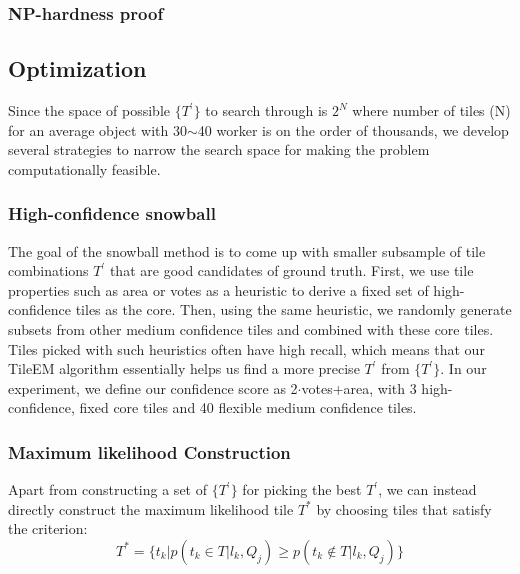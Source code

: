 \documentclass[letterpaper]{article} %
\begin{document}
\subsubsection{NP-hardness proof}
\subsection{Optimization}
Since the space of possible $\{T^{\prime}\}$ to search through is $2^{N}$ where number of tiles (N) for an average object with 30$\sim$40 worker is on the order of thousands, we develop several strategies to narrow the search space for making the problem computationally feasible. 
\subsubsection{High-confidence snowball}
The goal of the snowball method is to come up with smaller subsample of tile combinations $T^\prime$ that are good candidates of ground truth. First, we use tile properties such as area or votes as a heuristic to derive a fixed set of high-confidence tiles as the core. Then, using the same heuristic, we randomly generate subsets from other medium confidence tiles and combined with these core tiles. Tiles picked with such heuristics often have high recall, which means that our TileEM algorithm essentially helps us find a more precise $T^{\prime}$ from $\{T^{\prime}\}$. In our experiment, we define our confidence score as 2$\cdot$votes+area, with 3 high-confidence, fixed core tiles and 40 flexible medium confidence tiles. 
\subsubsection{Maximum likelihood Construction}
Apart from constructing a set of  $\{T^{\prime}\}$ for picking the best  $T^{\prime}$, we can instead directly construct the maximum likelihood tile $T^*$ by choosing tiles that satisfy the criterion: 
\begin{equation}
T^* = \{t_k|p(t_k\in T|l_k,Q_j)\geq p(t_k\notin T|l_k,Q_j)\}
\end{equation}
\end{document}
